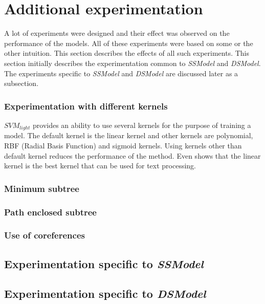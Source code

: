\section{Additional experimentation}\label{sec:experiments}

A lot of experiments were designed and their effect was observed on the performance of the models. All of these experiments were based on some or the other intuition. This section describes the effects of all such experiments. This section initially describes the experimentation common to \textit{SSModel} and \textit{DSModel}. The experiments specific to \textit{SSModel} and \textit{DSModel} are discussed later as a subsection.

\subsubsection*{Experimentation with different kernels}

$SVM_{light}$ provides an ability to use several kernels for the purpose of training a model. The default kernel is the linear kernel and other kernels are polynomial, RBF (Radial Basis Function) and sigmoid kernels. Using kernels other than default kernel reduces the performance of the method. Even \cite{joachims1998text} shows that the linear kernel is the best kernel that can be used for text processing.

\subsubsection*{Minimum subtree}
\subsubsection*{Path enclosed subtree}

\subsubsection*{Use of coreferences} \label{subsubsec:coref}

\subsection{Experimentation specific to \textit{SSModel}}

\subsection{Experimentation specific to \textit{DSModel}}

